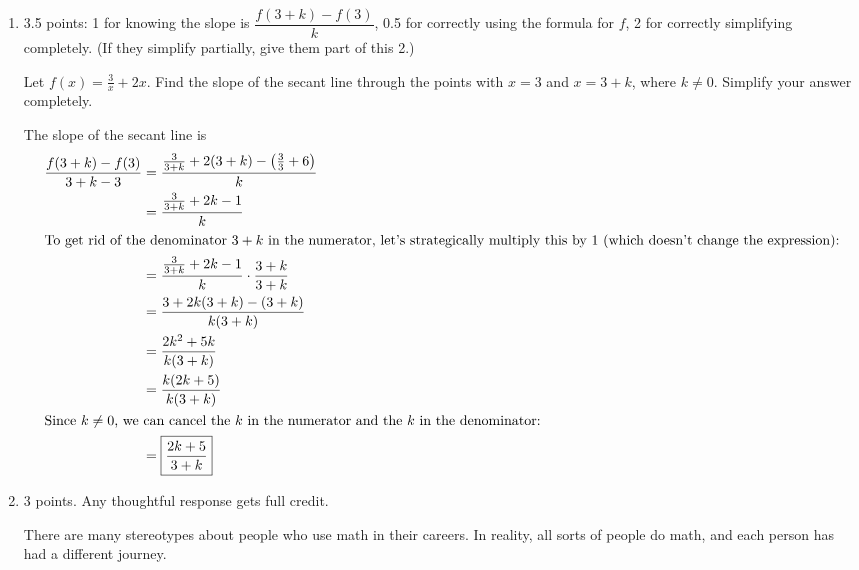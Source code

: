 \documentclass{article}
\begin{document}
\begin{enumerate}
\item  \begin{grading}
    3.5 points: 1 for knowing the slope is $\dfrac{ f(3+k) - f(3) }{k}$, 0.5 for correctly using the formula for $f$, 2 for correctly simplifying completely. (If they simplify partially, give them part of this 2.)
  \end{grading}

  \begin{problem}[\nstretch{2.5}]
    Let $f(x) = \frac{3}{x} + 2x$. Find the slope of the secant line through the points with $x = 3$ and $x = 3 + k$, where $k \neq 0$. Simplify your answer completely.
  \end{problem}

  \begin{solution}
    The slope of the secant line is 
    \begin{align*} 
      \frac{ f(3+k) - f(3) }{3+k - 3}  &=  \frac{\frac{  3}{3+k} +2
        (3+k) - \left( \frac{3}{3} + 6 \right)}{k} \\
      &= \frac{\frac{  3}{3+k} +2k - 1}{k} \\
      \intertext{To get rid of the denominator $3 + k$ in the
        numerator, let's strategically multiply this by 1 (which
        doesn't change the expression):}
      &= \frac{\frac{  3}{3+k} +2k - 1}{k} \cdot \frac{3 + k}{3 + k}
      \\
      &= \frac{3 + 2k (3 + k) - (3 + k)}{k (3 + k)} \\
      &= \frac{2k^2 + 5k}{k (3 + k)} \\
      &= \frac{k (2k + 5)}{k (3 + k)} \\
      \intertext{Since $k \neq 0$, we can cancel the $k$ in the numerator and the $k$ in the denominator:} %
      & =  \boxed{ \frac{  2 k + 5}{3+k} }
    \end{align*}  
  \end{solution}

\item 

  \begin{grading}
    3 points. Any thoughtful response gets full credit. 
  \end{grading}

  \begin{problem}[\vfill]
    There are many stereotypes about people who use math in their careers. In reality, all sorts of people do math, and each person has had a different journey.


\end{problem}
\end{enumerate}
\end{document}
